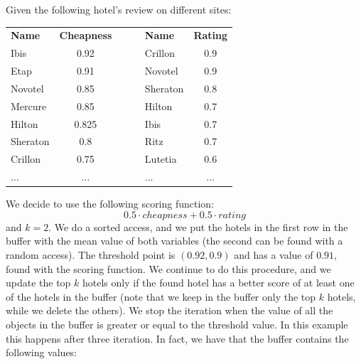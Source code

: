\documentclass[12pt, a4paper]{report}
\begin{document}
    \begin{example}
        Given the following hotel's review on different sites: 
        \begin{table}[H]
            \centering
            \begin{tabular}{|lc|c|lc|}
            \cline{1-2} \cline{4-5}
            \textbf{Name} & \textbf{Cheapness} & $\:\:\:\:\:\:$ & \textbf{Name} & \textbf{Rating} \\ \cline{1-2} \cline{4-5} 
            Ibis          & 0.92               &                & Crillon       & 0.9             \\ 
            Etap          & 0.91               &                & Novotel       & 0.9             \\ 
            Novotel       & 0.85               &                & Sheraton      & 0.8             \\ 
            Mercure       & 0.85               &                & Hilton        & 0.7             \\ 
            Hilton        & 0.825              &                & Ibis          & 0.7             \\ 
            Sheraton      & 0.8                &                & Ritz          & 0.7             \\ 
            Crillon       & 0.75               &                & Lutetia       & 0.6             \\ 
            $\dots$       & $\dots$            &                & $\dots$       & $\dots$         \\ \cline{1-2} \cline{4-5} 
            \end{tabular}
        \end{table}
        We decide to use the following scoring function: 
        \[0.5 \cdot cheapness+0.5 \cdot rating\]
        and $k=2$. We do a sorted access, and we put the hotels in the first row in the buffer with the mean value of both variables (the 
        second can be found with a random access). The threshold point is $(0.92,0.9)$ and has a value of $0.91$, found with the scoring 
        function. We continue to do this procedure, and we update the top $k$ hotels only if the found hotel has a better score of at least
        one of the hotels in the buffer (note that we keep in the buffer only the top $k$ hotels, while we delete the others). 
        We stop the iteration when the value of all the objects in the buffer is greater or equal to the threshold value. In this example this
        happens after three iteration. In fact, we have that the buffer contains the following values: 

\end{example}
\end{document}
